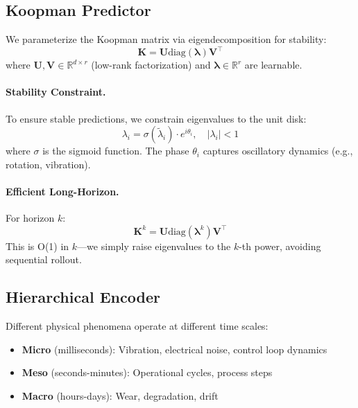 \documentclass{article}
\begin{document}
\subsection{Koopman Predictor}

We parameterize the Koopman matrix via eigendecomposition for stability:
\begin{equation}
    \mathbf{K} = \mathbf{U} \text{diag}(\boldsymbol{\lambda}) \mathbf{V}^\top
\end{equation}
where $\mathbf{U}, \mathbf{V} \in \mathbb{R}^{d \times r}$ (low-rank factorization) and $\boldsymbol{\lambda} \in \mathbb{R}^r$ are learnable.

\paragraph{Stability Constraint.} To ensure stable predictions, we constrain eigenvalues to the unit disk:
\begin{equation}
    \lambda_i = \sigma(\tilde{\lambda}_i) \cdot e^{i\theta_i}, \quad |\lambda_i| < 1
\end{equation}
where $\sigma$ is the sigmoid function. The phase $\theta_i$ captures oscillatory dynamics (e.g., rotation, vibration).

\paragraph{Efficient Long-Horizon.} For horizon $k$:
\begin{equation}
    \mathbf{K}^k = \mathbf{U} \text{diag}(\boldsymbol{\lambda}^k) \mathbf{V}^\top
\end{equation}
This is O(1) in $k$—we simply raise eigenvalues to the $k$-th power, avoiding sequential rollout.

\subsection{Hierarchical Encoder}

Different physical phenomena operate at different time scales:
\begin{itemize}
    \item \textbf{Micro} (milliseconds): Vibration, electrical noise, control loop dynamics
    \item \textbf{Meso} (seconds-minutes): Operational cycles, process steps
    \item \textbf{Macro} (hours-days): Wear, degradation, drift
\end{itemize}
\end{document}
